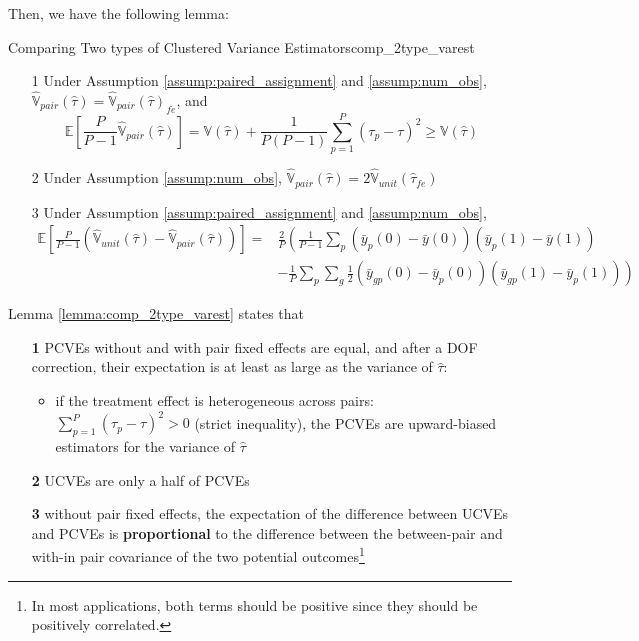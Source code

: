 \documentclass[twoside]{article}
\begin{document}
Then, we have the following lemma:
\begin{lemma}{Comparing Two types of Clustered Variance Estimators}{comp_2type_varest}
    \begin{itemize}
        \item[1] Under Assumption \ref{assump:paired_assignment} and \ref{assump:num_obs}, $\hat{\mathbb{V}}_{pair}\left(\hat{\tau}\right) = \hat{\mathbb{V}}_{pair}\left(\hat{\tau}\right)_{fe}$, and 
        $$ \mathbb{E}\left[\frac{P}{P-1}\hat{\mathbb{V}}_{pair}\left(\hat{\tau}\right)\right] = \mathbb{V}\left(\hat{\tau}\right) + \frac{1}{P(P-1)}\sum^P_{p=1}\left(\tau_p-\tau\right)^2 \geq \mathbb{V}\left(\hat{\tau}\right) $$
        \item[2] Under Assumption \ref{assump:num_obs}, $\hat{\mathbb{V}}_{pair}\left(\hat{\tau}\right) = 2\hat{\mathbb{V}}_{unit}\left(\hat{\tau}_{fe}\right)$
        \item[3] Under Assumption \ref{assump:paired_assignment} and \ref{assump:num_obs}, 
        \begin{align*}
            \mathbb{E}\left[ \frac{P}{P-1}\left(\hat{\mathbb{V}}_{unit}\left(\hat{\tau}\right) - \hat{\mathbb{V}}_{pair}\left(\hat{\tau}\right)\right) \right] =& \frac{2}{P}\left( \frac{1}{P-1} \sum_p\left(\bar{y}_p(0)-\bar{y}(0)\right)\left(\bar{y}_p(1)-\bar{y}(1)\right) \right. \\
            & \left.-\frac{1}{P} \sum_p\sum_g \frac{1}{2}\left(\bar{y}_{gp}(0)-\bar{y}_p(0)\right) \left(\bar{y}_{gp}(1)-\bar{y}_p(1)\right) \right)
        \end{align*}
    \end{itemize}
\end{lemma}
Lemma \ref{lemma:comp_2type_varest} states that 
\begin{itemize}
    \item[\textbf{1}] PCVEs without and with pair fixed effects are equal, and after a DOF correction, their expectation is at least as large as the variance of $\hat{\tau}$:
    \begin{itemize}
        \item if the treatment effect is heterogeneous across pairs: $\sum^P_{p=1}\left(\tau_p-\tau\right)^2>0$ (strict inequality), the PCVEs are upward-biased estimators for the variance of $\hat{\tau}$
    \end{itemize}
    \item[\textbf{2}] UCVEs are only a half of PCVEs
    \item[\textbf{3}] without pair fixed effects, the expectation of the difference between UCVEs and PCVEs is \textbf{proportional} to the difference between the between-pair and with-in pair covariance of the two potential outcomes\footnote{In most applications, both terms should be positive since they should be positively correlated.}
\end{itemize}
\end{document}

